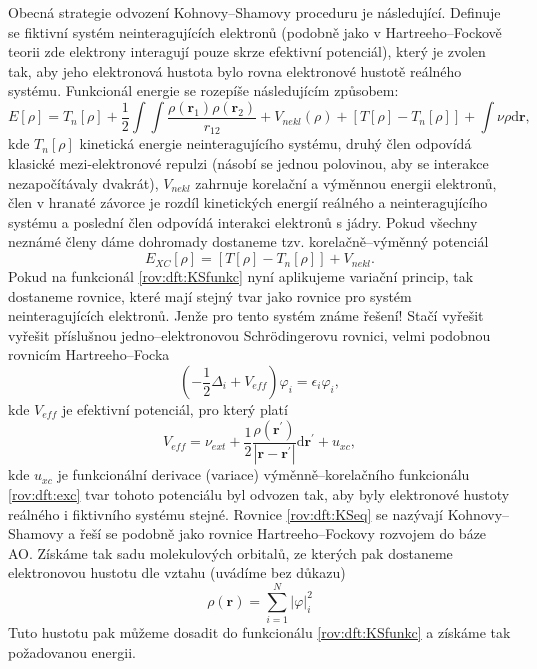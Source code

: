 Obecná strategie odvození Kohnovy--Shamovy proceduru je následující. Definuje se fiktivní systém neinteragujících elektronů (podobně jako v Hartreeho--Fockově teorii zde elektrony interagují pouze skrze efektivní potenciál), který je zvolen tak, aby jeho elektronová hustota bylo rovna elektronové hustotě reálného systému. 
Funkcionál energie se rozepíše následujícím způsobem:
\begin{equation}
E[\rho]= T_{n}[\rho] + \frac{1}{2}\int \int \frac{\rho(\textbf{r}_1)\rho(\textbf{r}_2)}{r_{12}} + V_{nekl}(\rho) +\left[T[\rho]-T_{n}[\rho]\right] + \int \nu \rho \mathrm{d}\textbf{r},
\label{rov:dft:KSfunkc}
\end{equation}
kde $T_{n}[\rho]$ kinetická energie neinteragujícího systému, druhý člen odpovídá klasické mezi-elektronové repulzi (násobí se jednou polovinou, aby se interakce nezapočítávaly dvakrát), $V_{nekl}$ zahrnuje korelační a výměnnou energii elektronů, člen v hranaté závorce je rozdíl kinetických energií reálného a neinteragujícího systému  a poslední člen odpovídá interakci elektronů s jádry. Pokud všechny neznámé členy dáme dohromady dostaneme tzv. korelačně--výměnný potenciál
\begin{equation}	
E_{XC}[\rho]=\left[T[\rho]-T_{n}[\rho]\right] +  V_{nekl} .
\label{rov:dft:exc}
\end{equation}
Pokud na funkcionál \eqref{rov:dft:KSfunkc} nyní aplikujeme variační princip, tak dostaneme rovnice, které mají stejný tvar jako rovnice
pro systém neinteragujících elektronů. Jenže pro tento systém známe řešení! Stačí vyřešit vyřešit příslušnou jedno--elektronovou  	 Schr\"{o}dingerovu rovnici, velmi podobnou rovnicím Hartreeho--Focka
\begin{equation}
\left(-\frac{1}{2}\Delta_i + V_{eff} \right) \varphi_i =\epsilon_i \varphi_i ,
\label{rov:dft:KSeq}
\end{equation}
kde $V_{eff}$ je efektivní potenciál, pro který platí
\begin{equation}
V_{eff}=\nu_{ext}+\frac{1}{2}\frac{\rho(\textbf{r}^{\prime})}{|\textbf{r}-\textbf{r}^{\prime}|}\mathrm{d}\textbf{r}^{\prime}+u_{xc} ,
\end{equation}
kde $u_{xc}$ je funkcionální derivace (variace) výměnně--korelačního funkcionálu \ref{rov:dft:exc} tvar tohoto potenciálu byl odvozen tak, aby byly elektronové hustoty reálného i fiktivního systému stejné.
Rovnice \ref{rov:dft:KSeq} se nazývají Kohnovy--Shamovy a řeší se podobně jako rovnice Hartreeho--Fockovy rozvojem do báze AO.
Získáme tak sadu molekulových orbitalů, ze kterých pak dostaneme elektronovou hustotu dle vztahu (uvádíme bez důkazu)
\begin{equation}
\rho(\textbf{r}) = \sum_{i=1}^N |\varphi|_i^2
\label{rov:dft:KSrho}
\end{equation}
Tuto hustotu pak můžeme dosadit do funkcionálu \eqref{rov:dft:KSfunkc} a získáme tak požadovanou energii.

